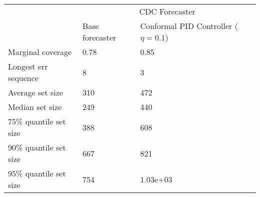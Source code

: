 \begin{tabular}{lll}
\toprule
& \multicolumn{2}{c}{CDC Forecaster} \\
& Base forecaster & Conformal PID Controller ($\eta=0.1$) \\
\midrule
Marginal coverage & 0.78 & 0.85 \\
Longest err sequence & 8 & 3 \\
Average set size & 310 & 472 \\
Median set size & 249 & 440 \\
75\% quantile set size & 388 & 608 \\
90\% quantile set size & 667 & 821 \\
95\% quantile set size & 754 & 1.03e+03 \\
\bottomrule
\end{tabular}

